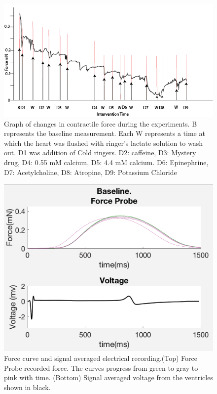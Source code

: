 \documentclass[12pt]{article}
\begin{document}

\begin{figure}[H]
	\label{fig:ForceGraph}
	\centering
	\includegraphics[width = .95\textwidth]{Figures/ForceGraph.png}
	\caption{Graph of changes in contractile force during the experiments. B represents the baseline measurement. Each W represents a time at which the heart was flushed with ringer's lactate solution to wash out. D1 was addition of Cold ringers. D2: caffeine, D3: Mystery drug, D4: 0.55 mM calcium, D5: 4.4 mM calcium. D6: Epinephrine, D7: Acetylcholine, D8: Atropine, D9: Potassium Chloride }
\end{figure}



\begin{figure}[H]
	\label{fig:Baseline}
	\centering
	\includegraphics[width = .95\textwidth]{Figures/Baseline.png}
	\caption{Force curve and signal averaged electrical recording.(Top) Force Probe recorded force. The curves progress from green to gray to pink with time. (Bottom) Signal averaged voltage from the ventricles shown in black. }
\end{figure}
\end{document}
